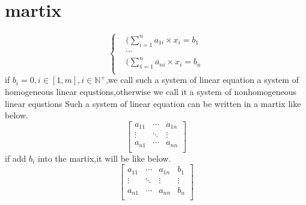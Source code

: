 \documentclass[a4paper,12pt]{report}
\begin{document}
\section{martix}
$$
\left\{
\begin{aligned}
    &(\sum_{i=1}^n a_{1i}\times x_i=b_1\\
    &\cdots\\
    &(\sum_{1=1}^n a_{ni}\times x_i=b_n\\
\end{aligned}
\right.
$$
if $b_i=0,i\in[1,m],i\in\mathbb{N}^+$,we call such a system of linear equation a system of homogeneous linear equstions,otherwise we call it a system of nonhomogeneous linear equstions
Such a system of linear equation can be written in a martix like below.
$$
\begin{bmatrix}
a_{11} & \cdots & a_{1n}\\
\vdots & \ddots & \vdots\\
a_{n1} & \cdots & a_{nn}\\
\end{bmatrix}
$$
if add $b_i$ into the martix,it will be like below.
$$
\left[
\begin{array}{ccc|c}
    a_{11} & \cdots & a_{1n} & b_1\\
    \vdots & \ddots & \vdots & \vdots \\
    a_{n1} & \cdots & a_{nn} & b_n\\
\end{array}
\right]
$$
\end{document}
